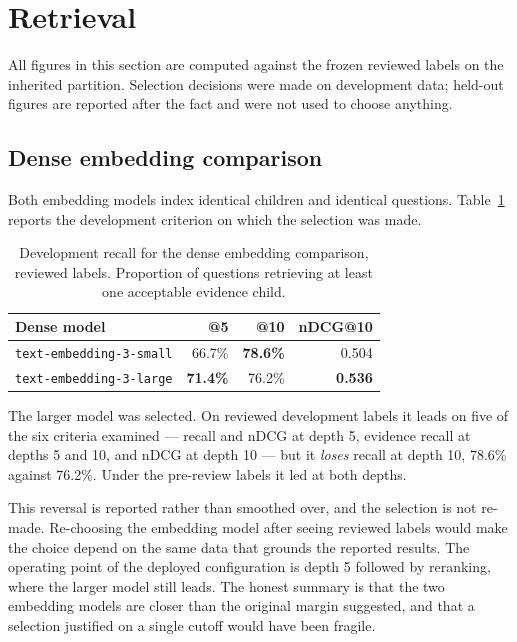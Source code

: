 \section{Retrieval}
\label{sec:retrieval-results}

All figures in this section are computed against the frozen reviewed labels on
the inherited partition. Selection decisions were made on development data;
held-out figures are reported after the fact and were not used to choose anything.

\subsection{Dense embedding comparison}

Both embedding models index identical children and identical questions.
Table~\ref{tab:dense-dev} reports the development criterion on which the
selection was made.

\begin{table}[htbp]
  \centering
  \caption{Development recall for the dense embedding comparison, reviewed labels. Proportion of questions retrieving at least one acceptable evidence child.}
  \label{tab:dense-dev}
  \begin{tabular}{lrrr}
    \toprule
    \textbf{Dense model} & \textbf{@5} & \textbf{@10} & \textbf{nDCG@10} \\
    \midrule
    \texttt{text-embedding-3-small} & 66.7\% & \textbf{78.6\%} & 0.504 \\
    \texttt{text-embedding-3-large} & \textbf{71.4\%} & 76.2\% & \textbf{0.536} \\
    \bottomrule
  \end{tabular}
\end{table}

The larger model was selected. On reviewed development labels it leads on five of
the six criteria examined --- recall and nDCG at depth 5, evidence recall at
depths 5 and 10, and nDCG at depth 10 --- but it \emph{loses} recall at depth 10,
78.6\% against 76.2\%. Under the pre-review labels it led at both depths.

This reversal is reported rather than smoothed over, and the selection is not
re-made. Re-choosing the embedding model after seeing reviewed labels would make
the choice depend on the same data that grounds the reported results. The
operating point of the deployed configuration is depth 5 followed by reranking,
where the larger model still leads. The honest summary is that the two embedding
models are closer than the original margin suggested, and that a selection
justified on a single cutoff would have been fragile.

